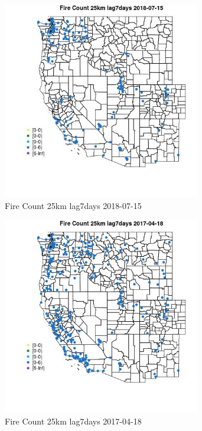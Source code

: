 \begin{figure} 
\centering  
\includegraphics[width=0.77\textwidth]{Code_Outputs/Report_ML_input_PM25_Step4_part_e_de_duplicated_aves_compiled_2019-05-21wNAs_MapObsFire_Count_25km_lag7days2018-07-15.jpg} 
\caption{\label{fig:Report_ML_input_PM25_Step4_part_e_de_duplicated_aves_compiled_2019-05-21wNAsMapObsFire_Count_25km_lag7days2018-07-15}Fire Count 25km lag7days 2018-07-15} 
\end{figure} 
 

\clearpage 

\begin{figure} 
\centering  
\includegraphics[width=0.77\textwidth]{Code_Outputs/Report_ML_input_PM25_Step4_part_e_de_duplicated_aves_compiled_2019-05-21wNAs_MapObsFire_Count_25km_lag7days2017-04-18.jpg} 
\caption{\label{fig:Report_ML_input_PM25_Step4_part_e_de_duplicated_aves_compiled_2019-05-21wNAsMapObsFire_Count_25km_lag7days2017-04-18}Fire Count 25km lag7days 2017-04-18} 
\end{figure} 
 

